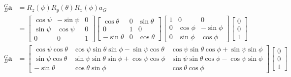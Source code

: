 \begin{align}
    \begin{split}
    {}^G_B\pmb{a} &= R_z(\psi) R_y(\theta) R_x(\phi) a_G \\
    &= 
    \begin{bmatrix}
        \cos\psi & -\sin\psi & 0 \\
        \sin\psi & \cos\psi & 0 \\
        0 & 0 & 1
    \end{bmatrix}
    \begin{bmatrix}
        \cos\theta & 0 & \sin\theta \\
        0 & 1 & 0 \\
        -\sin\theta & 0 & \cos\theta
    \end{bmatrix}
    \begin{bmatrix}
        1 & 0 & 0 \\
        0 & \cos\phi & -\sin\phi \\
        0 & \sin\phi & \cos\phi 
    \end{bmatrix}
    \begin{bmatrix}
        0 \\
        0 \\
        1
    \end{bmatrix}\\
    {}^G_B \pmb{a} &= 
    \begin{bmatrix}
        \cos\psi\cos\theta & \cos\psi\sin\theta\sin\phi-\sin\psi\cos\theta & \cos\psi\sin\theta\cos\phi+\sin\psi\sin\phi \\
        \sin\psi\cos\theta & \sin\psi\sin\theta\sin\phi+\cos\psi\cos\phi & \sin\psi\sin\theta\cos\phi-\cos\psi\sin\phi \\
        -\sin\theta & \cos\theta\sin\phi & \cos\theta\cos\phi
    \end{bmatrix}
    \begin{bmatrix}
        0 \\
        0 \\
        1
    \end{bmatrix}
    \end{split}
\end{align}